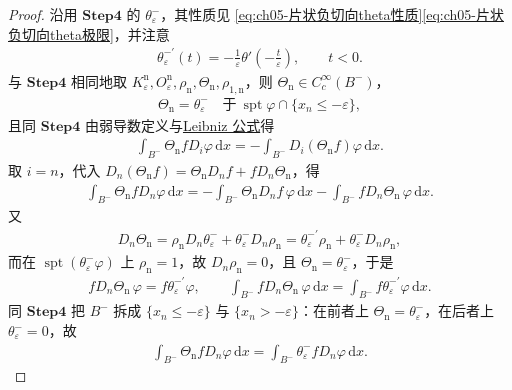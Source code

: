 \documentclass[../../main.tex]{subfiles}
\begin{document}
\begin{proof}
沿用 $\mathbf{Step}\bm{4}$ 的 $\theta_{\varepsilon}^{-}$，其性质见 \eqref{eq:ch05-片状负切向theta性质}\eqref{eq:ch05-片状负切向theta极限}，并注意
\begin{align}
\theta_{\varepsilon}^{-\prime}(t)=-\frac{1}{\varepsilon}\theta'\left(-\frac{t}{\varepsilon}\right),\qquad t<0.
\label{eq:ch05-片状法向theta导数}
\end{align}
与 $\mathbf{Step}\bm{4}$ 相同地取 $K_{\varepsilon}^{\mathrm{n}},O_{\varepsilon}^{\mathrm{n}},\rho_{\mathrm{n}},\Theta_{\mathrm{n}},\rho_{1,\mathrm{n}}$，则 $\Theta_{\mathrm{n}}\in C_{c}^{\infty}(B^{-})$，
\begin{align}
\Theta_{\mathrm{n}}=\theta_{\varepsilon}^{-}\quad\text{于}\ \operatorname{spt}\varphi\cap\{x_n\leqslant-\varepsilon\},
\label{eq:ch05-片状法向Theta定义}
\end{align}
且同 $\mathbf{Step}\bm{4}$ 由弱导数定义与\hyperref[theorem:ch05-弱导数性质-4]{Leibniz 公式}得
\begin{align}
\int_{B^{-}}\Theta_{\mathrm{n}}fD_i\varphi\,\mathrm{d}x
=-\int_{B^{-}}D_i(\Theta_{\mathrm{n}}f)\varphi\,\mathrm{d}x.
\label{eq:ch05-片状法向Theta}
\end{align}
取 $i=n$，代入 $D_n(\Theta_{\mathrm{n}}f)=\Theta_{\mathrm{n}}D_nf+fD_n\Theta_{\mathrm{n}}$，得
\begin{align}
\int_{B^{-}}\Theta_{\mathrm{n}}fD_n\varphi\,\mathrm{d}x
=-\int_{B^{-}}\Theta_{\mathrm{n}}D_nf\,\varphi\,\mathrm{d}x
-\int_{B^{-}}fD_n\Theta_{\mathrm{n}}\,\varphi\,\mathrm{d}x.
\label{eq:ch05-片状法向1}
\end{align}
又
\begin{align}
D_n\Theta_{\mathrm{n}}
=\rho_{\mathrm{n}}D_n\theta_{\varepsilon}^{-}+\theta_{\varepsilon}^{-}D_n\rho_{\mathrm{n}}
=\theta_{\varepsilon}^{-\prime}\rho_{\mathrm{n}}+\theta_{\varepsilon}^{-}D_n\rho_{\mathrm{n}},
\label{eq:ch05-片状法向导数}
\end{align}
而在 $\operatorname{spt}(\theta_{\varepsilon}^{-}\varphi)$ 上 $\rho_{\mathrm{n}}=1$，故 $D_n\rho_{\mathrm{n}}=0$，且 $\Theta_{\mathrm{n}}=\theta_{\varepsilon}^{-}$，于是
\begin{align}
fD_n\Theta_{\mathrm{n}}\,\varphi=f\theta_{\varepsilon}^{-\prime}\varphi,
\qquad
\int_{B^{-}}fD_n\Theta_{\mathrm{n}}\,\varphi\,\mathrm{d}x
=\int_{B^{-}}f\theta_{\varepsilon}^{-\prime}\varphi\,\mathrm{d}x.
\label{eq:ch05-片状法向2}
\end{align}
同 $\mathbf{Step}\bm{4}$ 把 $B^{-}$ 拆成 $\{x_n\leqslant-\varepsilon\}$ 与 $\{x_n>-\varepsilon\}$：在前者上 $\Theta_{\mathrm{n}}=\theta_{\varepsilon}^{-}$，在后者上 $\theta_{\varepsilon}^{-}=0$，故
\begin{align}
\int_{B^{-}}\Theta_{\mathrm{n}}fD_n\varphi\,\mathrm{d}x
=\int_{B^{-}}\theta_{\varepsilon}^{-}fD_n\varphi\,\mathrm{d}x.
\label{eq:ch05-片状法向替换}
\end{align}


\end{proof}
\end{document}
